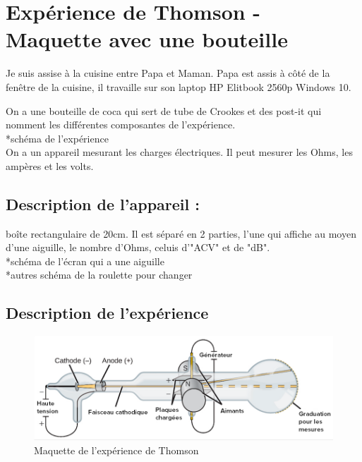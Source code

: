 \documentclass[../main.tex]{subfiles}
\begin{document}
\section{Expérience de Thomson - Maquette avec une bouteille}
Je suis assise à la cuisine entre Papa et Maman. Papa est assis à côté de la fenêtre de la cuisine, il travaille sur son laptop HP Elitbook 2560p Windows 10.\\
\par On a une bouteille de coca qui sert de tube de Crookes et des post-it qui nomment les différentes composantes de l'expérience.\\
*schéma de l'expérience\\
On a un appareil mesurant les charges électriques. Il peut mesurer les Ohms, les ampères et les volts.\\
\subsection{Description de l'appareil : }
boîte rectangulaire de 20cm. Il est séparé en 2 parties, l'une qui affiche au moyen d'une aiguille, le nombre d'Ohms, celuis d'"ACV" et de "dB".\\
*schéma de l'écran qui a une aiguille\\
*autres schéma de la roulette pour changer\\
\subsection{Description de l'expérience}
\begin{figure}[h!]
    \centering
    \includegraphics[scale=0.7]{images/02.JJ-Thomson.png}
    \caption{Maquette de l'expérience de Thomson}
    \label{fig:my_label}
\end{figure}
\end{document}
